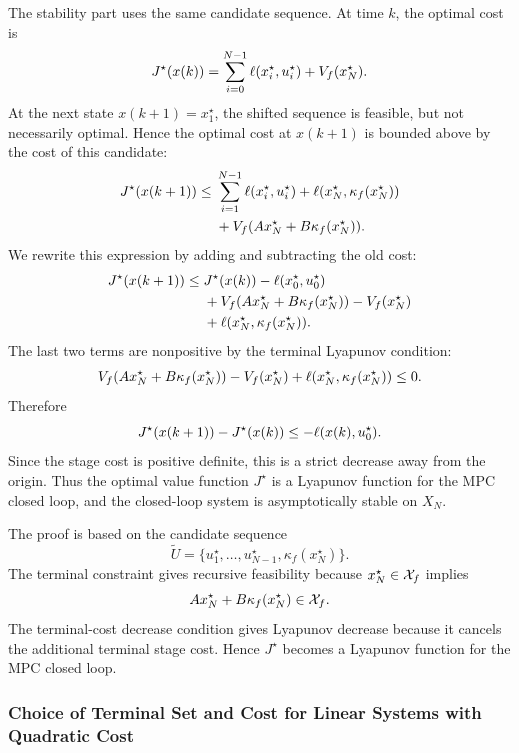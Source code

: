 The stability part uses the same candidate sequence. At time \(k\), the optimal cost is
\[
    J^\star(x(k))
    =
    \sum_{i=0}^{N-1}\ell(x_i^\star,u_i^\star)
    +
    V_f(x_N^\star).
\]
At the next state \(x(k+1)=x_1^\star\), the shifted sequence is feasible, but not necessarily
optimal. Hence the optimal cost at \(x(k+1)\) is bounded above by the cost of this candidate:
\[
\begin{aligned}
    J^\star(x(k+1))
    \leq\;&
    \sum_{i=1}^{N-1}\ell(x_i^\star,u_i^\star)
    +
    \ell(x_N^\star,\kappa_f(x_N^\star))\\
    &+
    V_f(Ax_N^\star+B\kappa_f(x_N^\star)).
\end{aligned}
\]
We rewrite this expression by adding and subtracting the old cost:
\[
\begin{aligned}
    J^\star(x(k+1))
    \leq\;&
    J^\star(x(k))
    -
    \ell(x_0^\star,u_0^\star)\\
    &+
    V_f(Ax_N^\star+B\kappa_f(x_N^\star))
    -
    V_f(x_N^\star)\\
    &+
    \ell(x_N^\star,\kappa_f(x_N^\star)).
\end{aligned}
\]
The last two terms are nonpositive by the terminal Lyapunov condition:
\[
    V_f(Ax_N^\star+B\kappa_f(x_N^\star))
    -
    V_f(x_N^\star)
    +
    \ell(x_N^\star,\kappa_f(x_N^\star))
    \leq 0.
\]
Therefore
\[
    J^\star(x(k+1))-J^\star(x(k))
    \leq
    -\ell(x(k),u_0^\star).
\]
Since the stage cost is positive definite, this is a strict decrease away from the origin. Thus
the optimal value function \(J^\star\) is a Lyapunov function for the MPC closed loop, and the
closed-loop system is asymptotically stable on \(X_N\).

\begin{theorembox}
The proof is based on the candidate sequence
\[
    \widetilde{U}
    =
    \{u_1^\star,\ldots,u_{N-1}^\star,\kappa_f(x_N^\star)\}.
\]
The terminal constraint gives recursive feasibility because \(x_N^\star\in\mathcal{X}_f\) implies
\[
    Ax_N^\star+B\kappa_f(x_N^\star)\in\mathcal{X}_f.
\]
The terminal-cost decrease condition gives Lyapunov decrease because it cancels the additional
terminal stage cost. Hence \(J^\star\) becomes a Lyapunov function for the MPC closed loop.
\end{theorembox}

\subsubsection{Choice of Terminal Set and Cost for Linear Systems with Quadratic Cost}

